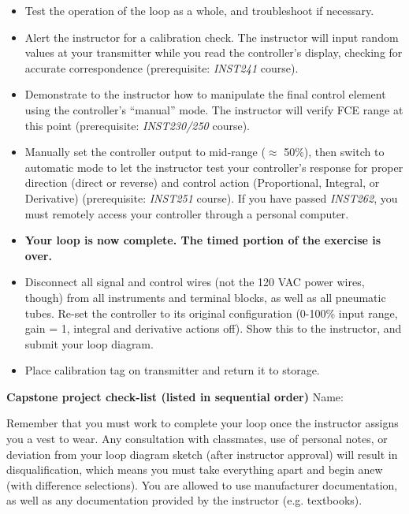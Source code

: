 \begin{itemize}
\vskip 10pt
\item{} Test the operation of the loop as a whole, and troubleshoot if necessary.
\vskip 10pt
\item{} Alert the instructor for a calibration check.  The instructor will input random values at your transmitter while you read the controller's display, checking for accurate correspondence (prerequisite: {\it INST241} course).
\vskip 10pt
\item{} Demonstrate to the instructor how to manipulate the final control element using the controller's ``manual'' mode.  The instructor will verify FCE range at this point (prerequisite: {\it INST230/250} course).
\vskip 10pt
\item{} Manually set the controller output to mid-range ($\approx$ 50\%), then switch to automatic mode to let the instructor test your controller's response for proper direction (direct or reverse) and control action (Proportional, Integral, or Derivative) (prerequisite: {\it INST251} course).  If you have passed {\it INST262}, you must remotely access your controller through a personal computer.
\vskip 10pt
\item{} {\bf Your loop is now complete.  The timed portion of the exercise is over.}
\vskip 10pt
\item{} Disconnect all signal and control wires (not the 120 VAC power wires, though) from all instruments and terminal blocks, as well as all pneumatic tubes.  Re-set the controller to its original configuration (0-100\% input range, gain = 1, integral and derivative actions off).  Show this to the instructor, and submit your loop diagram.
\vskip 10pt
\item{} Place calibration tag on transmitter and return it to storage.
\end{itemize}

\vskip 10pt


\vfil \eject

\noindent
\centerline{{\bf Capstone project check-list (listed in sequential order)} \hskip 50pt Name: \underbar{\hskip 80pt}}

\vskip 10pt

Remember that you must work  to complete your loop once the instructor assigns you a vest to wear.  Any consultation with classmates, use of personal notes, or deviation from your loop diagram sketch (after instructor approval) will result in disqualification, which means you must take everything apart and begin anew (with difference selections).  You are allowed to use manufacturer documentation, as well as any documentation provided by the instructor (e.g. textbooks).

